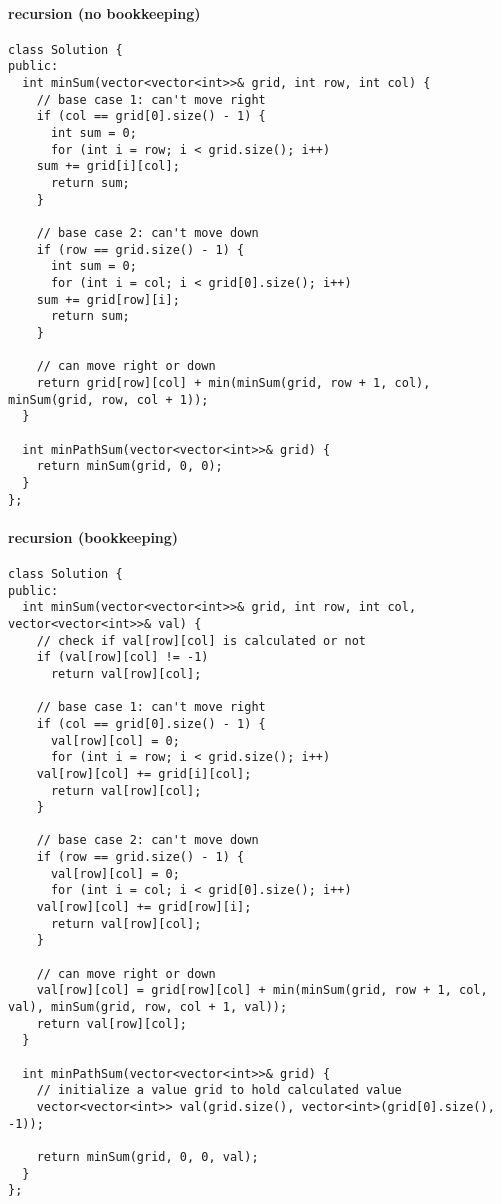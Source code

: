 \documentclass[12pt]{article}
\begin{document}
\paragraph{recursion (no bookkeeping)}
\label{sec:org7bba5be}
\begin{verbatim}
class Solution {
public:
  int minSum(vector<vector<int>>& grid, int row, int col) {
    // base case 1: can't move right
    if (col == grid[0].size() - 1) {
      int sum = 0;
      for (int i = row; i < grid.size(); i++)
	sum += grid[i][col];
      return sum;
    }

    // base case 2: can't move down
    if (row == grid.size() - 1) {
      int sum = 0;
      for (int i = col; i < grid[0].size(); i++)
	sum += grid[row][i];
      return sum;
    }

    // can move right or down 
    return grid[row][col] + min(minSum(grid, row + 1, col), minSum(grid, row, col + 1));
  }

  int minPathSum(vector<vector<int>>& grid) {
    return minSum(grid, 0, 0);
  }
};
\end{verbatim}
\paragraph{recursion (bookkeeping)}
\label{sec:org76bbbf0}
\begin{verbatim}
class Solution {
public:
  int minSum(vector<vector<int>>& grid, int row, int col, vector<vector<int>>& val) {
    // check if val[row][col] is calculated or not
    if (val[row][col] != -1)
      return val[row][col];

    // base case 1: can't move right
    if (col == grid[0].size() - 1) {
      val[row][col] = 0;
      for (int i = row; i < grid.size(); i++)
	val[row][col] += grid[i][col];      
      return val[row][col];
    }

    // base case 2: can't move down
    if (row == grid.size() - 1) {
      val[row][col] = 0;
      for (int i = col; i < grid[0].size(); i++)
	val[row][col] += grid[row][i];
      return val[row][col];
    }

    // can move right or down
    val[row][col] = grid[row][col] + min(minSum(grid, row + 1, col, val), minSum(grid, row, col + 1, val));
    return val[row][col];
  }

  int minPathSum(vector<vector<int>>& grid) {
    // initialize a value grid to hold calculated value
    vector<vector<int>> val(grid.size(), vector<int>(grid[0].size(), -1));

    return minSum(grid, 0, 0, val);
  }
};
\end{verbatim}
\end{document}
